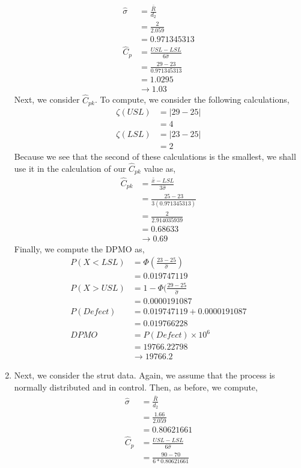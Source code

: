 \documentclass[letterpaper,10pt]{article}
\begin{document}
\begin{enumerate}
\begin{align*}
\hat{\sigma} &= \frac{\bar{R}}{d_2}\\
&=\frac{2}{2.059}\\
&=0.971345313\\
\hat{C}_p&=\frac{USL-LSL}{6\hat{\sigma}}\\
&=\frac{29-23}{0.971345313}\\
&=1.0295\\
&\to 1.03
\end{align*}
Next, we consider $\hat{C}_{pk}$. To compute, we consider the following calculations,
\begin{align*}
\zeta(USL) &= |29-25|\\
&= 4\\
\zeta(LSL) &= |23-25|\\
&=2
\end{align*}
Because we see that the second of these calculations is the smallest, we shall use it in the calculation of our $\hat{C}_{pk}$ value as,
\begin{align*}
\hat{C}_{pk} &= \frac{\bar{\bar{x}}-LSL}{3\hat{\sigma}}\\
&=\frac{25-23}{3(0.971345313)}\\
&=\frac{2}{2.914035939}\\
&=0.68633\\
&\to 0.69
\end{align*}
Finally, we compute the DPMO as,
\begin{align*}
P(X<LSL) &=\Phi(\frac{23-25}{\hat{\sigma}})\\
&=0.019747119\\
P(X>USL) &= 1-\Phi(\frac{29-25}{\hat{\sigma}}\\
&=0.0000191087\\
P(Defect) &= 0.019747119+0.0000191087\\
&=0.019766228\\
DPMO &= P(Defect)\times 10^6\\
&=19766.22798\\
&\to 19766.2
\end{align*}
\item Next, we consider the strut data. Again, we assume that the process is normally distributed and in control. Then, as before, we compute,
\begin{align*}
\hat{\sigma} &= \frac{\bar{R}}{d_2}\\
&=\frac{1.66}{2.059}\\
&=0.80621661\\
\hat{C}_p&=\frac{USL-LSL}{6\hat{\sigma}}\\
&=\frac{90-70}{6*0.80621661}\\

\end{align*}
\end{enumerate}
\end{document}
